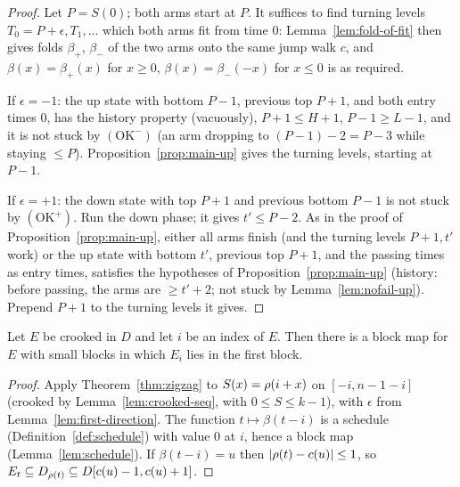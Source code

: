 \begin{proof}
Let $P=S(0)$; both arms start at $P$. It suffices to find turning levels $T_0=P+\epsilon,T_1,\dots$ which both arms fit from time
$0$: Lemma~\ref{lem:fold-of-fit} then gives folds $\beta_+$, $\beta_-$ of the two arms onto the same jump walk $c$, and
$\beta(x)=\beta_+(x)$ for $x\ge0$, $\beta(x)=\beta_-(-x)$ for $x\le0$ is as required.

If $\epsilon=-1$: the up state with bottom $P-1$, previous top $P+1$, and both entry times $0$, has the history property (vacuously),
$P+1\le H+1$, $P-1\ge L-1$, and it is not stuck by $(\mathrm{OK}^-)$ (an arm dropping to $(P-1)-2=P-3$ while staying $\le P$).
Proposition~\ref{prop:main-up} gives the turning levels, starting at $P-1$.

If $\epsilon=+1$: the down state with top $P+1$ and previous bottom $P-1$ is not stuck by $(\mathrm{OK}^+)$. Run the down phase; it
gives $t'\le P-2$. As in the proof of Proposition~\ref{prop:main-up}, either all arms finish (and the turning levels $P+1,t'$ work) or the
up state with bottom $t'$, previous top $P+1$, and the passing times as entry times, satisfies the hypotheses of
Proposition~\ref{prop:main-up} (history: before passing, the arms are $\ge t'+2$; not stuck by Lemma~\ref{lem:nofail-up}). Prepend $P+1$
to the turning levels it gives.
\end{proof}


\begin{corollary}\label{cor:theorem3}
Let $E$ be crooked in $D$ and let $i$ be an index of $E$. Then there is a block map for $E$ with small blocks in which $E_i$ lies in the
first block.
\end{corollary}

\begin{proof}
Apply Theorem~\ref{thm:zigzag} to $S(x)=\rho(i+x)$ on $[-i,n-1-i]$ (crooked by Lemma~\ref{lem:crooked-seq}, with $0\le S\le k-1$), with
$\epsilon$ from Lemma~\ref{lem:first-direction}. The function $t\mapsto\beta(t-i)$ is a schedule (Definition~\ref{def:schedule}) with value
$0$ at $i$, hence a block map (Lemma~\ref{lem:schedule}). If $\beta(t-i)=u$ then $\left\lvert \rho(t)-c(u)\right\rvert\le1$, so $E_t\subseteq
D_{\rho(t)}\subseteq D[c(u)-1,c(u)+1]$.
\end{proof}

